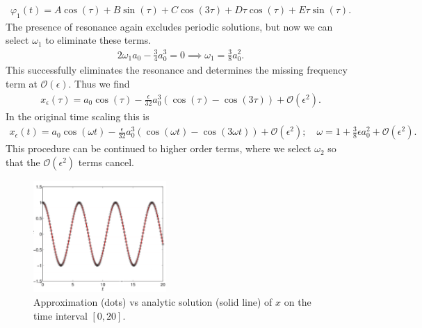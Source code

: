 \begin{ex}
\begin{align}
	\varphi_1(t) = A \cos(\tau) + B \sin(\tau) + C \cos(3\tau) + D\tau \cos(\tau) + E \tau \sin(\tau).
\end{align}
The presence of resonance again excludes periodic solutions, but now we can select $\omega_1$ to eliminate these terms.
\begin{align}
	2\omega_1 a_0 - \frac{3}{4} a_0 ^{3} = 0 \implies \boxed{\omega_1 = \frac{3}{8}a_0^{2}.}
\end{align}
This successfully eliminates the resonance and determines the missing frequency term at $\mathcal{O}(\epsilon)$. Thus we find
\begin{align}
	x_\epsilon(\tau) = a_0 \cos(\tau) - \frac{\epsilon}{32}a_0^{3}\left( \cos(\tau) - \cos (3\tau) \right) + \mathcal{O}(\epsilon^2).
\end{align}
In the original time scaling this is
\begin{align}
	x_\epsilon (t) = a_0 \cos (\omega t) - \frac{\epsilon}{32} a_0^3 \left( \cos(\omega t) - \cos(3\omega t)\right) + \mathcal{O}(\epsilon^2); \quad \omega = 1+ \frac{3}{8}\epsilon a_0^2 + \mathcal{O}(\epsilon^2).	
\end{align}
This procedure can be continued to higher order terms, where we select $\omega_2$ so that the $\mathcal{O}(\epsilon^2)$ terms cancel.
\begin{figure}[h!]
	\centering
	\includegraphics[width=0.45\textwidth]{figures/ch1/19approximation_accuracy.png}
	\caption{Approximation (dots) vs analytic solution (solid line) of $x$ on the time interval $[0,20]$.}
\end{figure}

\end{ex}
